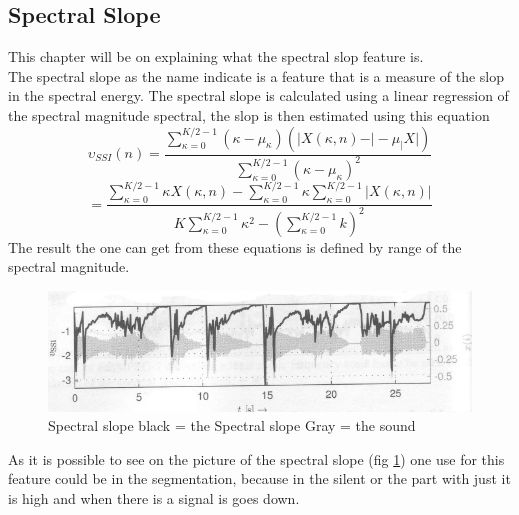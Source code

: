 \subsection{Spectral Slope}
This chapter will be on explaining what the spectral slop feature is.\\
The spectral slope as the name indicate is a feature that is a measure of the slop in the spectral energy\citep{ACA}. The spectral slope is calculated using a linear regression of the spectral magnitude spectral, the slop is then estimated using this equation\citep{ACA}
\begin{equation}
	\upsilon _{SSI} (n) = \frac{\displaystyle\sum_{\kappa = 0}^{K/2-1}(\kappa - \mu_\kappa)(\vert X(\kappa,n) - \vert - \mu_\vert X \vert)}{\displaystyle\sum_{\kappa = 0}^{K/2-1}(\kappa - \mu_\kappa)^2}
\end{equation}
\begin{equation}
	= \frac{\displaystyle\sum_{\kappa = 0}^{K/2-1}\kappa X(\kappa,n) - \displaystyle\sum_{\kappa = 0}^{K/2-1}\kappa\displaystyle\sum_{\kappa = 0}^{K/2-1}\vert X(\kappa,n)\vert}{K \displaystyle\sum_{\kappa = 0}^{K/2-1}\kappa^2-(\displaystyle\sum_{\kappa = 0}^{K/2-1}k)^2}
\end{equation}
The result the one can get from these equations is defined by range of the spectral magnitude.
\begin{figure}[h]
	\begin{center}
		\includegraphics[scale = 0.5]{fig/spectral_slope_fig.jpg}
		\caption{Spectral slope black = the Spectral slope Gray = the sound \citep{ACA}}
		\label{Spectral slope pic}
	\end{center}
\end{figure}
As it is possible to see on the picture of the spectral slope (fig \ref{Spectral slope pic}) one use for this feature could be in the segmentation, because in the silent or the part with just it is high and when there is a signal is goes down. 
